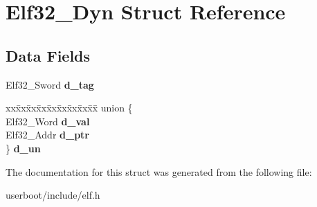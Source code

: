 \hypertarget{structElf32__Dyn}{}\section{Elf32\+\_\+\+Dyn Struct Reference}
\label{structElf32__Dyn}
\subsection*{Data Fields}
\begin{DoxyCompactItemize}
\item 
Elf32\+\_\+\+Sword {\bfseries d\+\_\+tag}\hypertarget{structElf32__Dyn_a0edbe45a1c49cbb352dc3e1937369180}{}\label{structElf32__Dyn_a0edbe45a1c49cbb352dc3e1937369180}

\item 
\begin{tabbing}
xx\=xx\=xx\=xx\=xx\=xx\=xx\=xx\=xx\=\kill
union \{\\
\>Elf32\_Word {\bfseries d\_val}\\
\>Elf32\_Addr {\bfseries d\_ptr}\\
\} {\bfseries d\_un}\hypertarget{structElf32__Dyn_adf5cec6825a96323a646820eba1be522}{}\label{structElf32__Dyn_adf5cec6825a96323a646820eba1be522}
\\

\end{tabbing}\end{DoxyCompactItemize}


The documentation for this struct was generated from the following file\+:\begin{DoxyCompactItemize}
\item 
userboot/include/elf.\+h\end{DoxyCompactItemize}
